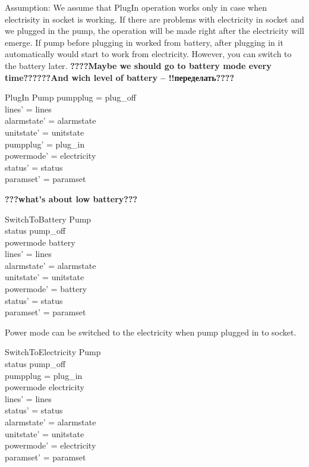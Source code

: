 \documentclass{article}
\begin{document}
	 Assumption: We assume that PlugIn operation works only in case when electrisity in socket is working. If there are problems with electricity in socket and we plugged in the pump, the operation will be made right after the electricity will emerge. If pump before plugging in worked from battery, after plugging in it automatically would start to work from electricity. However, you can switch to the battery later. 
		\textbf{????Maybe we should go to battery mode every time??????And wich level of battery -- !!переделать????}
	\begin{schema}{PlugIn}
		\Delta Pump 
	\where
		pumpplug = plug\_off \\
		lines' = lines  \\
    	alarmstate' = alarmstate \\
    	unitstate' = unitstate \\
    	pumpplug' = plug\_in \\
    	powermode' = electricity \\
		status' = status \\
		paramset' = paramset		
	\end{schema}
   
\textbf{???what's about low battery???}
	\begin{schema}{SwitchToBattery}
		\Delta Pump \\
	\where 
		status \neq pump\_off \\
		powermode \neq battery\\
		lines' = lines \\
		alarmstate' = alarmstate \\
		unitstate' = unitstate \\
		powermode' = battery \\
		status' = status \\
		paramset' = paramset \\
	\end{schema}
	
		Power mode can be switched to the electricity when pump plugged in to socket.
	
	\begin{schema}{SwitchToElectricity}
		\Delta Pump \\
	\where 
		status \neq pump\_off \\
		pumpplug = plug\_in \\
		powermode \neq electricity \\
		lines' = lines \\
		status' = status \\
		alarmstate' = alarmstate \\
		unitstate' = unitstate \\
		powermode' = electricity \\
		paramset' = paramset \\
	\end{schema}
	
\end{document}

